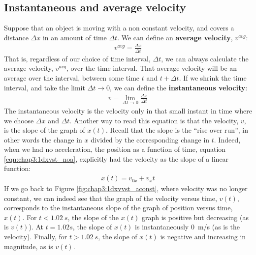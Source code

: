 \subsection{Instantaneous and average velocity}

Suppose that an object is moving with a non constant velocity, and covers a distance $\Delta x$ in an amount of time $\Delta t$. We can define an \textbf{average velocity}, $v^{avg}$:
\begin{align*}
v^{avg}= \frac{\Delta x}{\Delta t}
\end{align*}
That is, regardless of our choice of time interval, $\Delta t$, we can always calculate the average velocity, $v^{avg}$, over the time interval. That average velocity will be an average over the interval, between some time $t$ and $t+\Delta t$. If we shrink the time interval, and take the limit $\Delta t\to 0$, we can define the \textbf{instantaneous velocity}:
\begin{align*}
v = \lim_{\Delta t\to 0} \frac{\Delta x}{\Delta t}
\end{align*}
The instantaneous velocity is the velocity only in that small instant in time where we choose $\Delta x$ and $\Delta t$. Another way to read this equation is that the velocity, $v$, is the slope of the graph of $x(t)$. Recall that the slope is the ``rise over run'', in other words the change in $x$ divided by the corresponding change in $t$. Indeed, when we had no acceleration, the position as a function of time, equation \ref{eqn:chap3:1dxvst_noa}, explicitly had the velocity as the slope of a linear function:
 \begin{align*}
 x(t) = v_{0x}+v_xt
 \end{align*}
 If we go back to Figure \ref{fig:chap3:1dxvvst_aconst}, where velocity was no longer constant, we can indeed see that the graph of the velocity versus time, $v(t)$, corresponds to the instantaneous slope of the graph of position versus time, $x(t)$. For $t<\SI{1.02}{s}$, the slope of the $x(t)$ graph is positive but decreasing (as is $v(t)$). At $t=\SI{1}.02{s}$, the slope of $x(t)$ is instantaneously \SI{0}{m/s} (as is the velocity). Finally, for $t>\SI{1.02}{s}$, the slope of $x(t)$ is negative and increasing in magnitude, as is $v(t)$.

